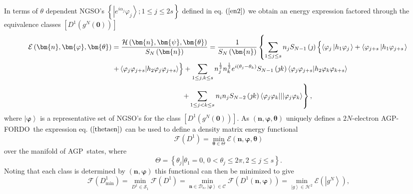 \documentclass{preprint}
\begin{document}
In terms of $\theta$ dependent NGSO's $\left\{ \left\vert
e^{i\alpha_{j}}\varphi_{j}\right\rangle ;1\leq j\leq2s\right\} $ defined in
eq. $\left( \ref{en2}\right) $ we obtain an energy expression factored
through the equivalence classes $\left[ D^{1}\left( g^{N}\left( \bm{0}%
\right) \right) \right] $
\begin{align}
\mathcal{E}\left( \bm{n},\bm{\varphi},\bm{\theta}\right) & =\frac {\mathcal{H%
}\left( \bm{n},\bm{\psi},\bm{\theta}\right) }{S_{N}\left( \bm{n}\right) }=%
\frac{1}{S_{N}\left( \bm{n}\right) }\left\{ \sum_{1\leq j\leq
s}n_{j}S_{N-1}\left( \jmath\right) \left\{ \overset{}{\left\langle
\varphi_{j}\left\vert h_{1}\varphi_{j}\right. \right\rangle +\left\langle
\varphi_{j+s}\left\vert h_{1}\varphi_{j+s}\right. \right\rangle }\right.
\right.  \notag \\
& \left. +\overset{}{\,\left\langle
\varphi_{j}\varphi_{j+s}|h_{2}\varphi_{j}\varphi_{j+s}\right\rangle }%
\right\} +\sum_{1\leq j,k\leq s}n_{j}^{\frac{1}{2}}n_{k}^{\frac{1}{2}%
}e^{i\left( \theta_{j}-\theta _{k}\right) }S_{N-1}\left( \jmath k\right)
\left\langle
\varphi_{j}\varphi_{j+s}|h_{2}\varphi_{k}\varphi_{k+s}\right\rangle  \notag
\\
& \qquad\qquad\qquad\qquad\qquad\left. +\sum_{1\leq j<k\leq
s}n_{i}n_{j}S_{N-2}\left( \jmath k\right) \left\langle \varphi_{j}\varphi
_{k}|||\varphi_{j}\varphi_{k}\right\rangle \right\} ,  \label{thetaen}
\end{align}
where $\left\vert \bm{\varphi}\right\rangle $ is a representative set of
NGSO's for the class $\left[ D^{1}\left( g^{N}\left( \bm{0}\right) \right) %
\right] $. As $\left( \bm{n},\bm{\varphi,\theta}\right) $ uniquely defines a
$2N$-electron AGP-FORDO\ the expression eq. $\left( \ref{thetaen}\right) $
can be used to define a density matrix energy functional
\begin{equation}
\mathcal{F}\left( D^{1}\right) =\min_{\bm{\theta\in}\Theta}\mathcal{E}\left( %
\bm{n},\bm{\varphi},\bm{\theta}\right)
\end{equation}
over the manifold of AGP\ states, where
\begin{equation}
\Theta=\left\{ \left. \theta_{j}\right\vert
\theta_{1}=0,\,0<\theta_{j}\leq2\pi,2\leq j\leq s\right\} .
\end{equation}
Noting that each class is determined by $\left( \bm{n},\bm{\varphi
}\right) $ this functional can then be minimized to give
\begin{equation}
\mathcal{F}\left( D_{\min}^{1}\right) =\min_{D^{1}\in\mathcal{S}_{1}}%
\mathcal{F}\left( D^{1}\right) =\min_{\bm{n\in}\mathcal{D}_{n},\left\vert %
\bm{\varphi}\right\rangle \in\mathcal{C}}\mathcal{F}\left( D^{1}\left( \bm{n}%
,\bm{\varphi}\right) \right) =\min_{\left\vert g\right\rangle \in\mathcal{H}%
^{2}}\mathcal{E}\left( \left\vert g^{N}\right\rangle \right) ,
\label{MinDMF}
\end{equation}
\end{document}
